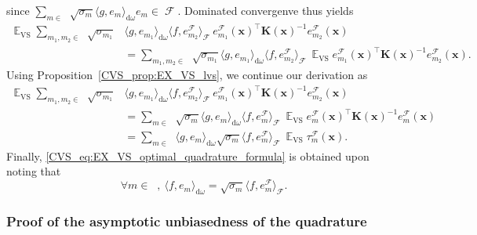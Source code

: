 \documentclass[twoside,11pt]{book}
\numberwithin{theorem}{chapter}
\numberwithin{definition}{chapter}
\numberwithin{proposition}{chapter}
\numberwithin{corollary}{chapter}
\numberwithin{example}{chapter}
\numberwithin{lemma}{chapter}
\numberwithin{assumption}{chapter}
\DeclareMathOperator{\VS}{\mathrm{VS}}
\DeclareMathOperator{\Tran}{\intercal}
\DeclareMathOperator{\EX}{\mathbb{E}}
\DeclareMathOperator{\F}{\mathcal{F}}
\DeclareMathOperator{\Ns}{\mathbb{N}^{*}}
\begin{document}
since $\sum_{m \in \Ns} \sqrt{\sigma_{m}}\langle g,e_{m} \rangle_{\mathrm{d}\omega} e_{m} \in \F$.
Dominated convergenve thus yields
\begin{align}
\EX_{\VS} \sum\limits_{m_{1},m_{2} \in \Ns} \sqrt{\sigma_{m_{1}}} & \langle g, e_{m_{1}} \rangle_{\mathrm{d}\omega}  \langle f, e_{m_{2}}^{\F} \rangle_{\F} \:e_{m_{1}}^{\F}(\bm{x})^{\Tran} \bm{K}(\bm{x})^{-1}e_{m_{2}}^{\F}(\bm{x}) \\
& = \sum\limits_{m_{1},m_{2} \in \Ns} \sqrt{\sigma_{m_{1}}} \langle g, e_{m_{1}} \rangle_{\mathrm{d}\omega}  \langle f, e_{m_{2}}^{\F} \rangle_{\F} \:\EX_{\VS} e_{m_{1}}^{\F}(\bm{x})^{\Tran} \bm{K}(\bm{x})^{-1}e_{m_{2}}^{\F}(\bm{x}).
\end{align}
Using Proposition~\ref{CVS_prop:EX_VS_lvs}, we continue our derivation as
\begin{align}
\EX_{\VS} \sum\limits_{m_{1},m_{2} \in \Ns} \sqrt{\sigma_{m_{1}}} & \langle g, e_{m_{1}} \rangle_{\mathrm{d}\omega}  \langle f, e_{m_{2}}^{\F} \rangle_{\F} \: e_{m_{1}}^{\F}(\bm{x})^{\Tran} \bm{K}(\bm{x})^{-1}e_{m_{2}}^{\F}(\bm{x}) \\
& = \sum\limits_{m \in \Ns} \sqrt{\sigma_{m}} \langle g, e_{m} \rangle_{\mathrm{d}\omega}  \langle f, e_{m}^{\F} \rangle_{\F} \: \EX_{\VS} e_{m}^{\F}(\bm{x})^{\Tran} \bm{K}(\bm{x})^{-1}e_{m}^{\F}(\bm{x})\\
& = \sum\limits_{m \in \Ns}  \langle g, e_{m} \rangle_{\mathrm{d}\omega}  \sqrt{\sigma_{m}}\langle f, e_{m}^{\F} \rangle_{\F} \: \EX_{\VS} \tau_{m}^{\F}(\bm{x}).
\end{align}
Finally, \eqref{CVS_eq:EX_VS_optimal_quadrature_formula} is obtained upon noting that
\begin{equation}
\forall m \in \Ns, \: \langle f,e_{m} \rangle_{\mathrm{d}\omega} = \sqrt{\sigma_{m}} \langle f,e_{m}^{\F} \rangle_{\F}.
\end{equation}
\subsubsection{Proof of the asymptotic unbiasedness of the quadrature }
\end{document}
